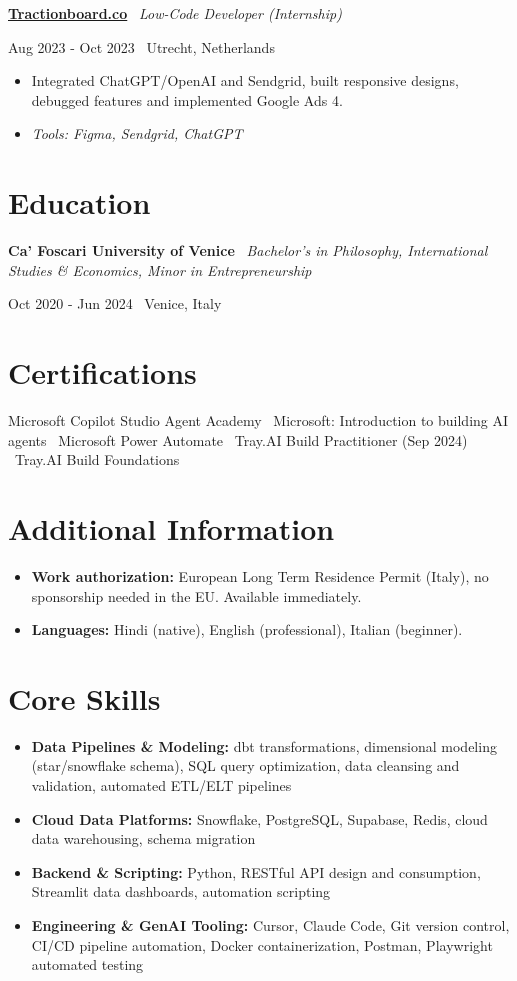 \documentclass[a4paper,10pt]{article}
\newcommand{\role}[4]{%
 \vspace{2pt}\noindent
 \begin{minipage}[t]{0.70\textwidth}\raggedright\textbf{#1} \textbullet\ \textit{#3}\end{minipage}%
 \hfill
 \begin{minipage}[t]{0.28\textwidth}\raggedleft\footnotesize\color{gray}#2 \textbullet\ #4\end{minipage}%
 \vspace{1pt}%
}
\begin{document}
\role{\href{https://tractionboard.co}{Tractionboard.co}}{Aug 2023 - Oct 2023}{Low-Code Developer (Internship)}{Utrecht, Netherlands}
\begin{itemize}
 \item Integrated ChatGPT/OpenAI and Sendgrid, built responsive designs, debugged features and implemented Google Ads 4.
 \item \textit{Tools: Figma, Sendgrid, ChatGPT}
\end{itemize}

\section{Education}
\role{Ca' Foscari University of Venice}{Oct 2020 - Jun 2024}{Bachelor's in Philosophy, International Studies \& Economics, Minor in Entrepreneurship}{Venice, Italy}

\section{Certifications}
Microsoft Copilot Studio Agent Academy \textbullet\ Microsoft: Introduction to building AI agents \textbullet\ Microsoft Power Automate \textbullet\ Tray.AI Build Practitioner (Sep 2024) \textbullet\ Tray.AI Build Foundations

\section{Additional Information}
\begin{itemize}
 \item \textbf{Work authorization:} European Long Term Residence Permit (Italy), no sponsorship needed in the EU. Available immediately.
 \item \textbf{Languages:} Hindi (native), English (professional), Italian (beginner).
\end{itemize}

\section{Core Skills}
\begin{itemize}
 \item \textbf{Data Pipelines \& Modeling:} dbt transformations, dimensional modeling (star/snowflake schema), SQL query optimization, data cleansing and validation, automated ETL/ELT pipelines
 \item \textbf{Cloud Data Platforms:} Snowflake, PostgreSQL, Supabase, Redis, cloud data warehousing, schema migration
 \item \textbf{Backend \& Scripting:} Python, RESTful API design and consumption, Streamlit data dashboards, automation scripting
 \item \textbf{Engineering \& GenAI Tooling:} Cursor, Claude Code, Git version control, CI/CD pipeline automation, Docker containerization, Postman, Playwright automated testing
\end{itemize}
\end{document}
